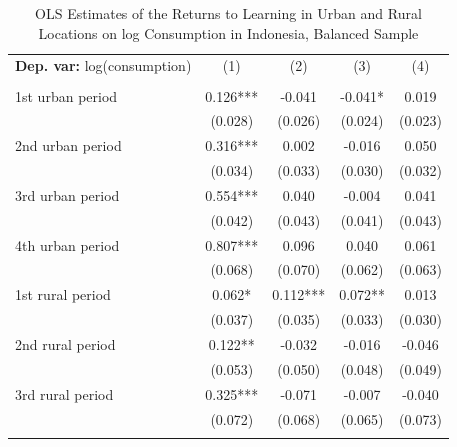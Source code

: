 \begin{table}[htbp] \centering \begin{threeparttable}
 \caption{OLS Estimates of the Returns to Learning in Urban and Rural Locations on log Consumption in Indonesia, Balanced Sample} 
 \label{tab:OLS_IDN_cons_learning_bal} 
\begin{tabular}{l cccc} \toprule  \textbf{Dep. var:}  log(consumption) 
                    &\multicolumn{1}{c}{(1)}   &\multicolumn{1}{c}{(2)}   &\multicolumn{1}{c}{(3)}   &\multicolumn{1}{c}{(4)}   \\
                    &               &               &               &               \\
\addlinespace
1st urban period    &       0.126***&      -0.041   &      -0.041*  &       0.019   \\
                    &     (0.028)   &     (0.026)   &     (0.024)   &     (0.023)   \\
\addlinespace
2nd urban period    &       0.316***&       0.002   &      -0.016   &       0.050   \\
                    &     (0.034)   &     (0.033)   &     (0.030)   &     (0.032)   \\
\addlinespace
3rd urban period    &       0.554***&       0.040   &      -0.004   &       0.041   \\
                    &     (0.042)   &     (0.043)   &     (0.041)   &     (0.043)   \\
\addlinespace
4th urban period    &       0.807***&       0.096   &       0.040   &       0.061   \\
                    &     (0.068)   &     (0.070)   &     (0.062)   &     (0.063)   \\
\addlinespace
1st rural period    &       0.062*  &       0.112***&       0.072** &       0.013   \\
                    &     (0.037)   &     (0.035)   &     (0.033)   &     (0.030)   \\
\addlinespace
2nd rural period    &       0.122** &      -0.032   &      -0.016   &      -0.046   \\
                    &     (0.053)   &     (0.050)   &     (0.048)   &     (0.049)   \\
\addlinespace
3rd rural period    &       0.325***&      -0.071   &      -0.007   &      -0.040   \\
                    &     (0.072)   &     (0.068)   &     (0.065)   &     (0.073)   \\
\addlinespace

\end{tabular}
\end{threeparttable}
\end{table}

